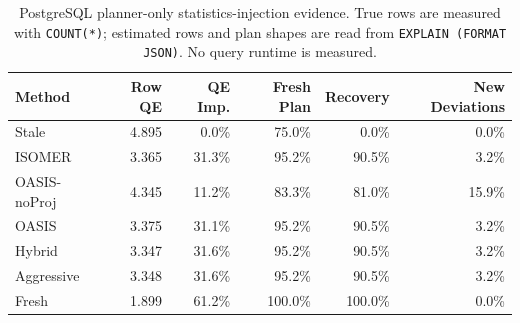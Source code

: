 \begin{table}[t]
  \centering
  \small
  \caption{PostgreSQL planner-only statistics-injection evidence. True rows are measured with \texttt{COUNT(*)}; estimated rows and plan shapes are read from \texttt{EXPLAIN (FORMAT JSON)}. No query runtime is measured.}
  \label{tab:postgres_planner_stats_injection}
  \setlength{\tabcolsep}{4pt}
  \begin{tabular}{lrrrrr}
    \toprule
    Method & Row QE & QE Imp. & Fresh Plan & Recovery & New Deviations \\
    \midrule
    Stale & 4.895 & 0.0\% & 75.0\% & 0.0\% & 0.0\% \\
    ISOMER & 3.365 & 31.3\% & 95.2\% & 90.5\% & 3.2\% \\
    OASIS-noProj & 4.345 & 11.2\% & 83.3\% & 81.0\% & 15.9\% \\
    OASIS & 3.375 & 31.1\% & 95.2\% & 90.5\% & 3.2\% \\
    Hybrid & 3.347 & 31.6\% & 95.2\% & 90.5\% & 3.2\% \\
    Aggressive & 3.348 & 31.6\% & 95.2\% & 90.5\% & 3.2\% \\
    Fresh & 1.899 & 61.2\% & 100.0\% & 100.0\% & 0.0\% \\
    \bottomrule
  \end{tabular}
\end{table}
